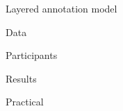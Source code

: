 \documentclass[10pt, compress]{beamer}
\begin{document}
\begin{frame}{Layered annotation model}


\end{frame}

\begin{frame}{Data}

\end{frame}

\begin{frame}{Participants}

\end{frame}

\begin{frame}{Results}

\end{frame}

\begin{frame}[standout]
Practical
\end{frame}
\end{document}
